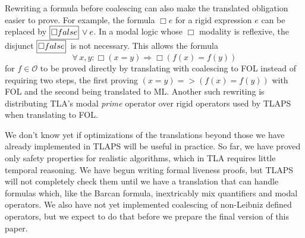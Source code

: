 \documentclass{easychair}
\renewcommand{\implies}{\Rightarrow}
\newcommand{\OO}{\mathcal{O}}
\newcommand{\B}[1]{\framebox{\rule{0pt}{.6em}\ensuremath{\!\tlachars #1\!}}\,}
\newcommand{\edmargin}[2]{\marginpar{\raggedright\footnotesize\color{red}#1: #2}}
\newcommand{\edmargin}[2]{}
\def\llnote{\ednote{LL}}
\def\llmargin{\edmargin{LL}}
\let\tlachars\relax
\def\A{\forall\,}
\newcommand{\FALSE}{\mbox{\sc false}}
\begin{document}
Rewriting a formula before coalescing can also make the translated
obligation easier to prove.  For example, the formula $\Box e$ for a
rigid expression $e$ can be replaced by $\B{\Box\FALSE} \lor e$.
%
%
In a modal logic whose
$\Box$ modality is
  reflexive, the disjunct $\B{\Box\FALSE}$ is not necessary.
%
This allows the formula
\[
  \A x,y : \Box(x=y) \implies \Box(f(x) = f(y))
 \]
for $f \in \OO$ to be proved directly by
translating with coalescing to FOL instead of requiring two steps, the
first proving $(x=y)=>(f(x)=f(y))$ with FOL and the second being
translated to ML\@.
%
Another such rewriting is distributing TLA's modal \emph{prime} operator
over rigid operators used by TLAPS when translating to FOL\@.
%

We don't know yet if optimizations of the translations beyond those we
have already implemented in TLAPS will be useful in practice.  So far,
we have proved only safety properties for realistic algorithms, which
in TLA requires little temporal reasoning.  We have begun writing
formal liveness proofs, but TLAPS will not completely check them until
we have a translation that can handle formulas which, like the Barcan
formula, inextricably mix quantifiers and modal operators.  We also
have not yet implemented coalescing of non-Leibniz defined operators,
but we expect to do that before we prepare the final version of
this paper.
\end{document}
